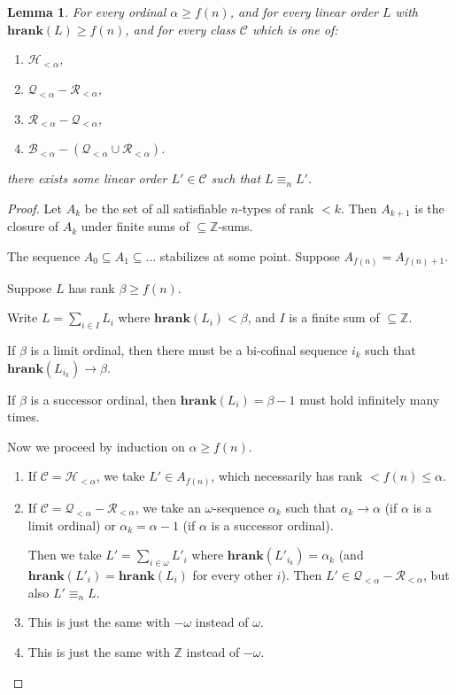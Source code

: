 \documentclass{article}
\newtheorem{lemma}{Lemma}
\newcommand{\hrank}[1]{\mathbf{hrank}\left( #1 \right)}
\newcommand{\agemo}{-\omega}
\newcommand{\ZZ}{\mathbb{Z}}
\begin{document}
\begin{lemma}
  For every ordinal $\alpha \ge f(n)$,
  and for every linear order $L$ with $\hrank{L} \ge f(n)$,
  and for every class $\mathcal{C}$ which is one of:
  \begin{enumerate}
    \item $\mathcal{H}_{< \alpha}$,
    \item $\mathcal{Q}_{< \alpha} - \mathcal{R}_{< \alpha}$,
    \item $\mathcal{R}_{< \alpha} - \mathcal{Q}_{< \alpha}$,
    \item $\mathcal{B}_{< \alpha} - (\mathcal{Q}_{< \alpha} \cup \mathcal{R}_{< \alpha})$.
  \end{enumerate}
  there exists some linear order $L' \in \mathcal{C}$ such that
  $L \equiv_n L'$.
\end{lemma}

\begin{proof}
  Let $A_k$ be the set of all satisfiable $n$-types of rank $< k$.
  Then $A_{k+1}$ is the closure of $A_k$ under finite sums
  of $\subseteq \ZZ$-sums.

  The sequence $A_0 \subseteq A_1 \subseteq \ldots$ stabilizes at some point.
  Suppose $A_{f(n)} = A_{f(n) + 1}$.

  Suppose $L$ has rank $\beta \ge f(n)$.

  Write $L = \sum_{i \in I} L_i$ where $\hrank{L_i} < \beta$, and 
  $I$ is a finite sum of $\subseteq \ZZ$.

  If $\beta$ is a limit ordinal, then there must be
  a bi-cofinal sequence $i_{k}$ such that $\hrank{L_{i_k}} \to \beta$.

  If $\beta$ is a successor ordinal, then $\hrank{L_i} = \beta - 1$ must hold
  infinitely many times.

  Now we proceed by induction on $\alpha \ge f(n)$.

  \begin{enumerate}
    \item If $\mathcal{C} = \mathcal{H}_{< \alpha}$, we take $L' \in A_{f(n)}$,
          which necessarily has rank $< f(n) \le \alpha$.
    \item If $\mathcal{C} = \mathcal{Q}_{< \alpha} - \mathcal{R}_{< \alpha}$,
          we take an $\omega$-sequence $\alpha_k$ such that $\alpha_k \to \alpha$
          (if $\alpha$ is a limit ordinal) or $\alpha_k = \alpha-1$
          (if $\alpha$ is a successor ordinal).

          Then we take $L' = \sum_{i \in \omega} L'_i$ where $\hrank{L'_{i_k}} = \alpha_k$
          (and $\hrank{L'_i} = \hrank{L_i}$ for every other $i$).
          Then $L' \in \mathcal{Q}_{< \alpha} - \mathcal{R}_{< \alpha}$,
          but also $L' \equiv_n L$.
    \item This is just the same with $\agemo$ instead of $\omega$.
    \item This is just the same with $\ZZ$ instead of $\agemo$.
  \end{enumerate}
\end{proof}
\end{document}

